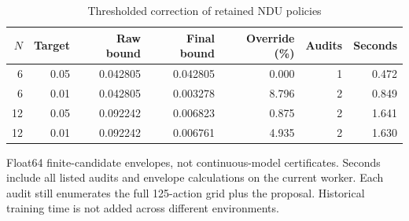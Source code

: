 \begin{table}[htbp]
\centering\small
\caption{Thresholded correction of retained NDU policies}\label{r8:tab:safeguard}
\begin{tabular}{@{}rrrrrrr@{}}
\toprule
$N$ & Target & Raw bound & Final bound & Override (\%) & Audits & Seconds \\
\midrule
6 & 0.05 & 0.042805 & 0.042805 & 0.000 & 1 & 0.472 \\
6 & 0.01 & 0.042805 & 0.003278 & 8.796 & 2 & 0.849 \\
12 & 0.05 & 0.092242 & 0.006823 & 0.875 & 2 & 1.641 \\
12 & 0.01 & 0.092242 & 0.006761 & 4.935 & 2 & 1.630 \\
\bottomrule
\end{tabular}
\par\smallskip\footnotesize Float64 finite-candidate envelopes, not continuous-model certificates. Seconds include all listed audits and envelope calculations on the current worker. Each audit still enumerates the full 125-action grid plus the proposal. Historical training time is not added across different environments.
\end{table}
